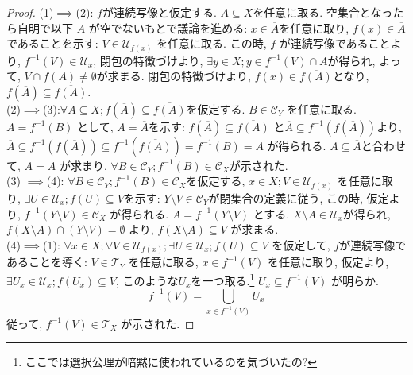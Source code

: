 \documentclass[dvipdfmx]{jbook}
\newcommand{\cl}[1]{\overline{ #1}  }
\theoremstyle{remark}
\theoremstyle{plain}
\begin{document}
\begin{proof}
	(1)$\implies$(2): $f$が連続写像と仮定する. $A \subseteq X$を任意に取る. 空集合となったら自明で以下 $A$ が空でないもとで議論を進める:
$x \in \cl{A}$を任意に取り,  $f(x) \in \cl{A}$であることを示す:
 $V \in \mathcal{U}_{f(x)}$ を任意に取る. 
 この時, $f$ が連続写像であることより, 
 $f^{-1}\left( V \right) \in \mathcal{U}_x$, 
 閉包の特徴づけより, 
 $\exists y \in X; y \in f^{-1}\left( V \right)\cap A$が得られ, 
 よって, $V \cap f(A) \neq \emptyset $が求まる. 
 閉包の特徴づけより, 
 $f(x) \in \cl{f(A)}$となり, $f\left( \cl{A} \right) \subseteq \cl{f\left( A \right) }$.\\
 	(2)$\implies$(3):$\forall A \subseteq X ; f\left( \cl{A} \right) \subseteq \cl{f\left( A \right) }$を仮定する. 
	$B \in \mathcal{C}_Y$ を任意に取る. 
	$A = f^{-1} \left( B \right) $ として, 
	$A = \cl{A}$を示す:
	 $ f\left( \cl{A} \right) \subseteq \cl{f\left( A \right) }  $ と$\cl{A} \subseteq f^{-1}\left( f(\cl{A}) \right)  $より,
	 $\cl{A} \subseteq f^{-1}\left( f(\cl{A}) \right) \subseteq f^{-1}\left( \cl{f\left( A \right) } \right)  = f ^{-1} \left( B \right) = A$ が得られる. 
	 $A \subseteq \cl{A}$と合わせて, $A = \cl{A}$ が求まり,
	 $\forall B \in \mathcal{C}_Y ; f^{-1}\left( B \right)  \in \mathcal{C}_X$が示された.\\
	 (3) $\implies$(4): $\forall B \in \mathcal{C}_Y; f^{-1}\left( B \right)  \in \mathcal{C}_X$を仮定する, 
	 $x \in X ; V \in \mathcal{U}_{f\left( x \right) }$ を任意に取り, $\exists U \in \mathcal{U}_x ; f\left( U \right) \subseteq V$を示す:
	 $Y \setminus V \in \mathcal{C}_Y$が閉集合の定義に従う, 
	 この時, 仮定より, $f^{-1}\left( Y\setminus V \right) \in \mathcal{C}_X$ が得られる. 
	 $A = f^{-1} \left( Y \setminus V \right) $ とする. 
	 $X\setminus A \in \mathcal{U}_x $が得られ, 
	 $f\left( X \setminus A \right) \cap \left( Y \setminus V \right) = \emptyset $ より, 
	 $f\left( X \setminus A \right) \subseteq V$ が求まる. \\
	(4)$\implies$(1): $\forall x \in X; \forall V \in \mathcal{U}_{f(x)};\exists U \in \mathcal{U}_x; f(U) \subseteq V $ を仮定して, $f$が連続写像であることを導く:
	 $V \in \mathcal{T}_Y$ を任意に取る, $x \in f^{-1}\left( V \right) $ を任意に取り, 
	 仮定より,$\exists U_x \in \mathcal{U}_x ; f(U_x) \subseteq V$, このような$U_x$を一つ取る.\footnote{ここでは選択公理が暗黙に使われているのを気づいたの?} $U_x \subseteq f^{-1}\left( V \right) $ が明らか. 
	 $$
	 f^{-1}\left( V \right) = \bigcup_{x \in f^{-1}\left( V \right) } U_x
	 $$
	 従って, $f^{-1} \left( V \right) \in \mathcal{T}_X$ が示された.
\end{proof}
\end{document}
